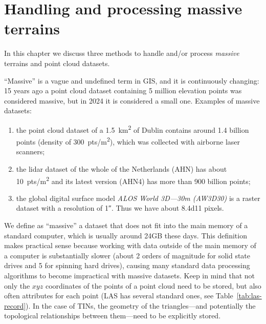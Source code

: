 
\setchapterpreamble[u]{\margintoc}

\chapter{Handling and processing massive terrains}%
\label{chap:massive}


\graphicspath{{massive/}}


In this chapter we discuss three methods to handle and/or process \emph{massive} terrains and point cloud datasets.

%

``Massive'' is a vague and undefined term in GIS, and it is continuously changing: 15 years ago a point cloud dataset containing 5 million elevation points was considered massive, but in 2024 it is considered a small one.%
Examples of massive datasets: 
\begin{enumerate}
  \item the point cloud dataset of a \qty{1.5}{km^2} of Dublin contains around 1.4 billion points (density of \qty{300}{pts/m^2}), which was collected with airborne laser scanners; 
  \item the lidar dataset of the whole of the Netherlands (AHN) has about \qty{10}{pts/m^2} and its latest version (AHN4) has more than 900 billion points;
  \item the global digital surface model \emph{ALOS World 3D---30m (AW3D30)} is a raster dataset with a resolution of \ang{;;1}. Thus we have about \num{8.4d11} pixels.
\end{enumerate}

%

We define as ``massive'' a dataset that does not fit into the main memory of a standard computer, which is usually around 24GB these days.
This definition makes practical sense because working with data outside of the main memory of a computer is substantially slower (about 2 orders of magnitude for solid state drives and 5 for spinning hard drives), causing many standard data processing algorithms to become impractical with massive datasets.
Keep in mind that not only the $xyz$ coordinates of the points of a point cloud need to be stored, but also often attributes for each point (LAS has several standard ones, see Table~\ref{tab:las-record}).
In the case of TINs, the geometry of the triangles---and potentially the topological relationships between them---need to be explicitly stored.

